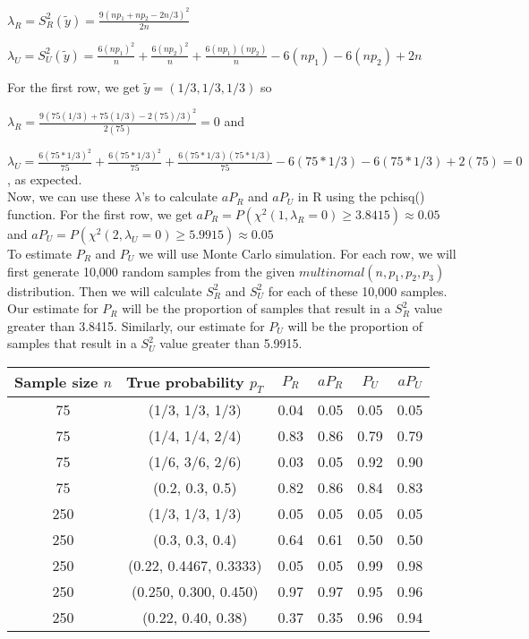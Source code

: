 \documentclass{article}
\begin{document}
$\lambda_R = S^2_R(\tilde{y}) = \frac{9(np_1+np_2-2n/3)^2}{2n}$

$\lambda_U = S^2_U(\tilde{y}) = \frac{6(np_1)^2}{n} + \frac{6(np_2)^2}{n} + \frac{6(np_1)(np_2)}{n} - 6(np_1) - 6(np_2) + 2n$

For the first row, we get $\tilde{y} = (1/3, 1/3, 1/3)$ so 

$\lambda_R = \frac{9(75(1/3)+75(1/3)-2(75)/3)^2}{2(75)} = 0$ and 

$\lambda_U = \frac{6(75*1/3)^2}{75} + \frac{6(75*1/3)^2}{75} + \frac{6(75*1/3)(75*1/3)}{75} - 6(75*1/3) - 6(75*1/3) + 2(75) = 0$, as expected.\\

Now, we can use these $\lambda$'s to calculate $aP_R$ and $aP_U$ in R using the pchisq() function. For the first row, we get $aP_R = P(\chi^2(1, \lambda_R = 0) \geq 3.8415) \approx 0.05$ and $aP_U = P(\chi^2(2, \lambda_U = 0) \geq 5.9915) \approx 0.05$\\

To estimate $P_R$ and $P_U$ we will use Monte Carlo simulation. For each row, we will first generate 10,000 random samples from the given $multinomal(n, p_1, p_2, p_3)$ distribution. Then we will calculate $S^2_R$ and $S^2_U$ for each of these 10,000 samples. Our estimate for $P_R$ will be the proportion of samples that result in a $S^2_R$ value greater than 3.8415. Similarly, our estimate for $P_U$ will be the proportion of samples that result in a $S^2_U$ value greater than 5.9915.
\\

\begin{tabular}{ |c|c|c|c|c|c|  }
 \hline
 Sample size $n$ & True probability $p_T$ & $P_R$ & $aP_R$ & $P_U$ & $aP_U$\\
 \hline
 75 & (1/3, 1/3, 1/3) & 0.04 & 0.05 & 0.05 & 0.05\\
 \hline
 75 & (1/4, 1/4, 2/4) & 0.83 & 0.86 & 0.79 & 0.79\\
 \hline
 75 & (1/6, 3/6, 2/6) & 0.03 & 0.05 & 0.92 & 0.90\\
 \hline
 75 & (0.2, 0.3, 0.5) & 0.82 & 0.86 & 0.84 & 0.83\\
 \hline
 250 & (1/3, 1/3, 1/3) & 0.05 & 0.05 & 0.05 & 0.05 \\
 \hline
 250 & (0.3, 0.3, 0.4) & 0.64 & 0.61 & 0.50 & 0.50\\
 \hline
 250 & (0.22, 0.4467, 0.3333) & 0.05 & 0.05 & 0.99 & 0.98\\
 \hline
 250 & (0.250, 0.300, 0.450) & 0.97 & 0.97 & 0.95 & 0.96\\
 \hline
 250 & (0.22, 0.40, 0.38) & 0.37 & 0.35 & 0.96 & 0.94\\
 \hline
\end{tabular}\\\\
\end{document}
